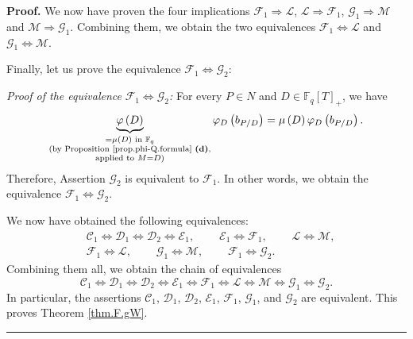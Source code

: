 \documentclass[numbers=enddot,12pt,final,onecolumn,notitlepage]{scrartcl}%
\theoremstyle{definition}
\newenvironment{proof}[1][Proof]{\noindent\textbf{#1.} }{\ \rule{0.5em}{0.5em}}
\begin{document}
\begin{proof}
We now have proven the four implications $\mathcal{F}_{1}\Longrightarrow
\mathcal{L}$, $\mathcal{L}\Longrightarrow\mathcal{F}_{1}$, $\mathcal{G}%
_{1}\Longrightarrow\mathcal{M}$ and $\mathcal{M}\Longrightarrow\mathcal{G}%
_{1}$. Combining them, we obtain the two equivalences $\mathcal{F}%
_{1}\Longleftrightarrow\mathcal{L}$ and $\mathcal{G}_{1}\Longleftrightarrow
\mathcal{M}$.

Finally, let us prove the equivalence $\mathcal{F}_{1}\Longleftrightarrow
\mathcal{G}_{2}$:

\textit{Proof of the equivalence }$\mathcal{F}_{1}\Longleftrightarrow
\mathcal{G}_{2}$\textit{:} For every $P\in N$ and $D\in\mathbb{F}_{q}\left[
T\right]  _{+}$, we have
\[
\underbrace{\varphi\left(  D\right)  }_{\substack{=\mu\left(  D\right)  \text{
in }\mathbb{F}_{q}\\\text{(by Proposition \ref{prop.phi-Q.formula}
\textbf{(d)},}\\\text{applied to }M=D\text{)}}}\varphi_{D}\left(
b_{P/D}\right)  =\mu\left(  D\right)  \varphi_{D}\left(  b_{P/D}\right)  .
\]
Therefore, Assertion $\mathcal{G}_{2}$ is equivalent to $\mathcal{F}_{1}$. In
other words, we obtain the equivalence $\mathcal{F}_{1}\Longleftrightarrow
\mathcal{G}_{2}$.

We now have obtained the following equivalences:%
\begin{align*}
&  \mathcal{C}_{1}\Longleftrightarrow\mathcal{D}_{1}\Longleftrightarrow
\mathcal{D}_{2}\Longleftrightarrow\mathcal{E}_{1}%
,\ \ \ \ \ \ \ \ \ \ \mathcal{E}_{1}\Longleftrightarrow\mathcal{F}%
_{1},\ \ \ \ \ \ \ \ \ \ \mathcal{L}\Longleftrightarrow\mathcal{M},\\
&  \mathcal{F}_{1}\Longleftrightarrow\mathcal{L}%
,\ \ \ \ \ \ \ \ \ \ \mathcal{G}_{1}\Longleftrightarrow\mathcal{M}%
,\ \ \ \ \ \ \ \ \ \ \mathcal{F}_{1}\Longleftrightarrow\mathcal{G}_{2}.
\end{align*}
Combining them all, we obtain the chain of equivalences%
\[
\mathcal{C}_{1}\Longleftrightarrow\mathcal{D}_{1}\Longleftrightarrow
\mathcal{D}_{2}\Longleftrightarrow\mathcal{E}_{1}\Longleftrightarrow
\mathcal{F}_{1}\Longleftrightarrow\mathcal{L}\Longleftrightarrow
\mathcal{M}\Longleftrightarrow\mathcal{G}_{1}\Longleftrightarrow
\mathcal{G}_{2}.
\]
In particular, the assertions $\mathcal{C}_{1}$, $\mathcal{D}_{1}$,
$\mathcal{D}_{2}$, $\mathcal{E}_{1}$, $\mathcal{F}_{1}$, $\mathcal{G}_{1}$,
and $\mathcal{G}_{2}$ are equivalent. This proves Theorem \ref{thm.F.gW}.
\end{proof}
\end{document}
